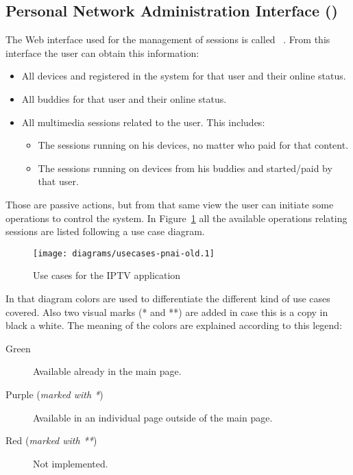 \subsection{Personal Network Administration Interface ()} %
\label{sub:pnai}

The Web interface used for the management of sessions is called ~\cite{SIV08A}. From this interface the user can obtain this information:

\begin{itemize}
  \item All devices and registered in the system for that user and their online status.
  \item All buddies for that user and their online status.
  \item All multimedia sessions related to the user. This includes:
  \begin{itemize}
    \item The sessions running on his devices, no matter who paid for that content.
    \item The sessions running on devices from his buddies and started/paid by that user.
  \end{itemize}
\end{itemize}

Those are passive actions, but from that same view the user can initiate some operations to control the system.
In Figure~\ref{fig:usecasesiptv} all the available operations relating sessions are listed following a use case diagram.

\begin{figure}[htbp]
  \centering
    \texttt{[image: diagrams/usecases-pnai-old.1]}
  \caption{Use cases for the IPTV application}
  \label{fig:usecasesiptv}
\end{figure}

In that diagram colors are used to differentiate the different kind of use cases covered. Also two visual marks (* and **) are added in case this is a copy in black a white. The meaning of the colors are explained according to this legend:

\begin{description}
  \item[Green] Available already in the main  page.
  \item[Purple (\emph{marked with *})] Available in an individual page outside of the main  page.
  \item[Red (\emph{marked with **})] Not implemented.
\end{description}

